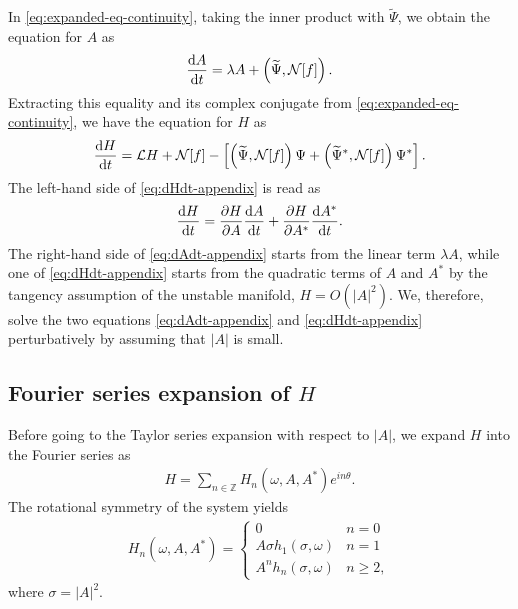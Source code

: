 In \eqref{eq:expanded-eq-continuity},
taking the inner product with $\widetilde{\Psi}$,
we obtain the equation for $A$ as
\begin{align}
  \frac{{\rm d}A}{{\rm d}t}
  = \lambda A + \left( \widetilde{\Psi}, \mathcal{N}[f] \right).
  \label{eq:dAdt-appendix}
\end{align}
Extracting this equality and its complex conjugate
from \eqref{eq:expanded-eq-continuity},
we have the equation for $H$ as
\begin{align}
  \frac{{\rm d}H}{{\rm d}t}
  = \mathcal{L}H + \mathcal{N}[f]
  - \left[ \left( \widetilde{\Psi}, \mathcal{N}[f] \right) \Psi
    + \left( \widetilde{\Psi}^{\ast}, \mathcal{N}[f] \right) \Psi^{\ast}
  \right].
  \label{eq:dHdt-appendix}
\end{align}
The left-hand side of \eqref{eq:dHdt-appendix} is read as
\begin{align}
  \frac{{\rm d}H}{{\rm d}t}
  = \frac{\partial H}{\partial A} \frac{{\rm d}A}{{\rm d}t}
  + \frac{\partial H}{\partial A^{\ast}} \frac{{\rm d}A^{\ast}}{{\rm d}t}.
\end{align}
The right-hand side of \eqref{eq:dAdt-appendix} 
starts from the linear term $\lambda A$,
while one of \eqref{eq:dHdt-appendix} starts from the quadratic terms
of $A$ and $A^{\ast}$ by the tangency assumption of the unstable manifold,
$H=O(|A|^{2})$.
We, therefore, solve the two equations
\eqref{eq:dAdt-appendix} and \eqref{eq:dHdt-appendix}
perturbatively by assuming that $|A|$ is small.


\subsection{Fourier series expansion of $H$}
Before going to the Taylor series expansion with respect to $|A|$,
we expand $H$ into the Fourier series as
\begin{align}
  H = \sum_{n\in\mathbb{Z}} H_{n}(\omega,A,A^{\ast}) e^{in\theta}.
\end{align}
The rotational symmetry of the system yields
\cite{crawford1994}
\begin{align}
  H_{n}(\omega,A,A^{*})=
  \begin{cases}
    0 & n=0\\
    A\sigma h_{1}(\sigma,\omega) & n=1\\
    A^{n}h_{n}(\sigma,\omega) & n\geq 2,
  \end{cases}
\end{align}
where $\sigma=|A|^{2}$.

